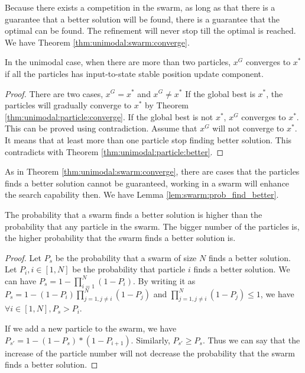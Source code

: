Because there exists a competition in the swarm, as long as that there is a guarantee that a better solution will be found, there is a guarantee that the optimal can be found.
The refinement will never stop till the optimal is reached.
We have Theorem \ref{thm:unimodal:swarm:converge}.

\begin{mythm}
\label{thm:unimodal:swarm:converge}
In the unimodal case, when there are more than two particles, $ x^{G} $ converges to $ x^{*} $ if all the particles has input-to-state stable position update component.
\begin{proof}
There are two cases, $ x^{G} = x^{*} $ and $ x^{G} \not = x^{*} $
If the global best is $ x^{*} $, the particles will gradually converge to $ x^{*} $ by Theorem \ref{thm:unimodal:particle:converge}.
If the global best is not $ x^{*} $, $ x^{G} $ converges to $ x^{*} $.
This can be proved using contradiction.
Assume that $ x^{G} $ will not converge to $ x^{*} $.
It means that at least more than one particle stop finding better solution.
This contradicts with Theorem \ref{thm:unimodal:particle:better}.
\end{proof}
\end{mythm}



As in Theorem \ref{thm:unimodal:swarm:converge},
there are cases that the particles finds a better solution cannot be guaranteed, working in a swarm will enhance the search capability then.
We have Lemma \ref{lem:swarm:prob_find_better}.

\begin{mylem}
\label{lem:swarm:prob_find_better}
The probability that a swarm finds a better solution is higher than the probability that any particle in the swarm.
The bigger number of the particles is, the higher probability that the swarm finds a better solution is.
\begin{proof}
Let $ P_{s} $ be the probability that a swarm of size $ N $ finds a better solution.
Let $ P_{i}, i \in [1, N] $ be the probability that particle $ i $ finds a better solution.
We can have  $ P_{s} = 1 - \prod_{i=1}^{N} ( 1 - P_{i} ) $.
By writing it as $ P_{s} = 1 - ( 1 - P_{i} ) \prod_{j=1, j \not = i}^{N}  ( 1 - P_{j} ) $ and $ \prod_{j=1, j \not = i}^{N}  ( 1 - P_{j} ) \leq 1 $, we have $ \forall i \in [1, N], P_{s} > P_{i} $.

If we add a new particle to the swarm, we have
$ P_{s'}  = 1 - (1- P_{s}) *(1-P_{i+1}) $. 
Similarly, $ P_{s'} \geq P_{s} $.
Thus we can say that the increase of the particle number will not decrease the probability that the swarm finds a better solution.
\end{proof}
\end{mylem}

